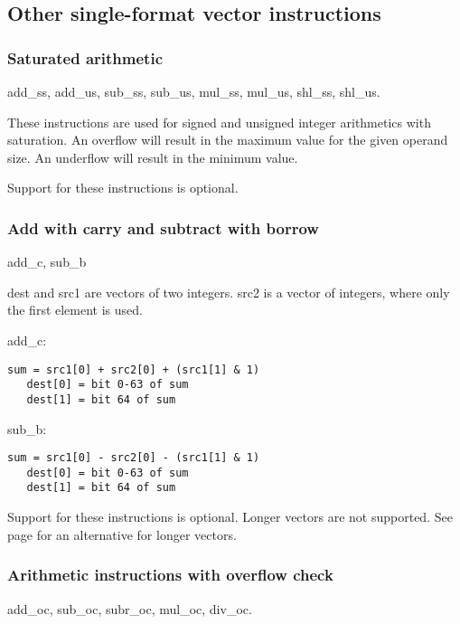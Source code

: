 \documentclass[forwardcom.tex]{subfiles}
\begin{document}
\vspace{2mm}
\subsection{Other single-format vector instructions}

\subsubsection{Saturated arithmetic} \label{saturatedArithmeticInstructions}
add\_ss, add\_us, sub\_ss, sub\_us, mul\_ss, mul\_us, shl\_ss, shl\_us.
\vspace{2mm}

These instructions are used for signed and unsigned integer arithmetics with saturation. An overflow will result in the maximum value for the given operand size. An underflow will result in the minimum value.
\vspace{2mm}

Support for these instructions is optional.

\subsubsection{Add with carry and subtract with borrow} \label{addWithCarryInstruction}
add\_c, sub\_b
\vspace{2mm}

dest and src1 are vectors of two integers. src2 is a vector of integers, where only the first element is used.
\vspace{2mm}

add\_c: 
\begin{lstlisting}[frame=none]
   sum = src1[0] + src2[0] + (src1[1] & 1)
   dest[0] = bit 0-63 of sum 
   dest[1] = bit 64 of sum
\end{lstlisting}

sub\_b:
\begin{lstlisting}[frame=none]
   sum = src1[0] - src2[0] - (src1[1] & 1)
   dest[0] = bit 0-63 of sum 
   dest[1] = bit 64 of sum
\end{lstlisting}

Support for these instructions is optional. Longer vectors are not supported. See page 
\pageref{highPrecisionArithmetic} for an alternative for longer vectors.

\subsubsection{Arithmetic instructions with overflow check} \label{instructionsWithOverflowCheck}
add\_oc, sub\_oc, subr\_oc, mul\_oc, div\_oc.
\vspace{2mm}
\end{document}

